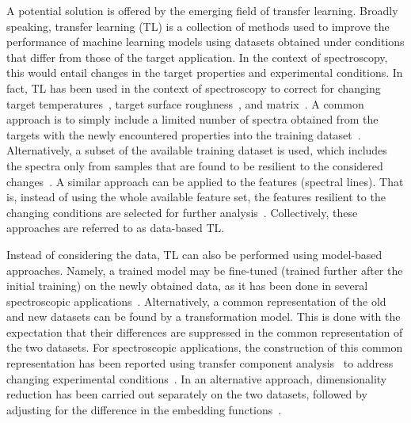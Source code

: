 \documentclass[preprint,11pt]{elsarticle}
\begin{document}
A potential solution is offered by the emerging field of transfer learning. Broadly speaking, transfer learning (TL) is a collection of methods used to improve the performance of machine learning models using datasets obtained under conditions that differ from those of the target application. In the context of spectroscopy, this would entail changes in the target properties and experimental conditions. In fact, TL has been used in the context of spectroscopy to correct for changing target temperatures~\cite{yang2018libs, kaneko2021transfer, chang2020assessment}, target surface roughness~\cite{shabbir2021transfer}, and matrix~\cite{sun2021machine}. A common approach is to simply include a limited number of spectra obtained from the targets with the newly encountered properties into the training dataset~\cite{shabbir2021transfer, li2021boosting, yu2021cross, brand2021predicting}. Alternatively, a subset of the available training dataset is used, which includes the spectra only from samples that are found to be resilient to the considered changes~\cite{li2021boosting, yu2021cross, chen2019cross}. A similar approach can be applied to the features (spectral lines). That is, instead of using the whole available feature set, the features resilient to the changing conditions are selected for further analysis~\cite{yang2018libs, kaneko2021transfer, sun2021machine, brand2021predicting}. Collectively, these approaches are referred to as data-based TL.

Instead of considering the data, TL can also be performed using model-based approaches. Namely, a trained model may be fine-tuned (trained further after the initial training) on the newly obtained data, as it has been done in several spectroscopic applications~\cite{kepes2022improving, li2020multi, liu2018transfer}. Alternatively, a common representation of the old and new datasets can be found by a transformation model. This is done with the expectation that their differences are suppressed in the common representation of the two datasets. For spectroscopic applications, the construction of this common representation has been reported using transfer component analysis~\cite{pan2010domain} to address changing experimental conditions~\cite{wang2019modeling}. In an alternative approach, dimensionality reduction has been carried out separately on the two datasets, followed by adjusting for the difference in the embedding functions~\cite{chen2021calibration}.
\end{document}
